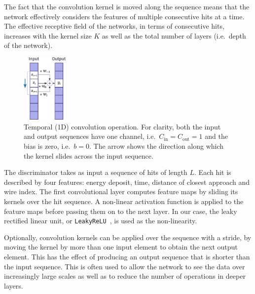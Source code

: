 The fact that the convolution kernel is moved along the sequence means that the network effectively considers the features of multiple consecutive hits at a time. The effective receptive field of the networks, in terms of consecutive hits, increases with the kernel size $K$ as well as the total number of layers (i.e.\ depth of the network).
\begin{figure}
    \centering
    \includegraphics[width=0.20\textwidth]{chapter4/1d_convolution.pdf}
    \caption{Temporal (1D) convolution operation. For clarity, both the input and output sequences have one channel, i.e.\  $C_\mathrm{in} = C_\mathrm{out} = 1$ and the bias is zero, i.e.\ $b = 0$. The arrow shows the direction along which the kernel slides across the input sequence.}
    \label{fig:temporal_conv}
\end{figure}

The discriminator takes as input a sequence of hits of length $L$. Each hit is described by four features: energy deposit, time, distance of closest approach and wire index. The first convolutional layer computes feature maps by sliding its kernels over the hit sequence. A non-linear activation function is applied to the feature maps before passing them on to the next layer. 
In our case, the leaky rectified linear unit, or \texttt{LeakyReLU}~\cite{Maas13rectifiernonlinearities}, is used as the non-linearity.

Optionally, convolution kernels can be applied over the sequence with a stride, by moving the kernel by more than one input element to obtain the next output element. This has the effect of producing an output sequence that is shorter than the input sequence. This is often used to allow the network to see the data over increasingly large scales as well as to reduce the number of operations in deeper layers. 

